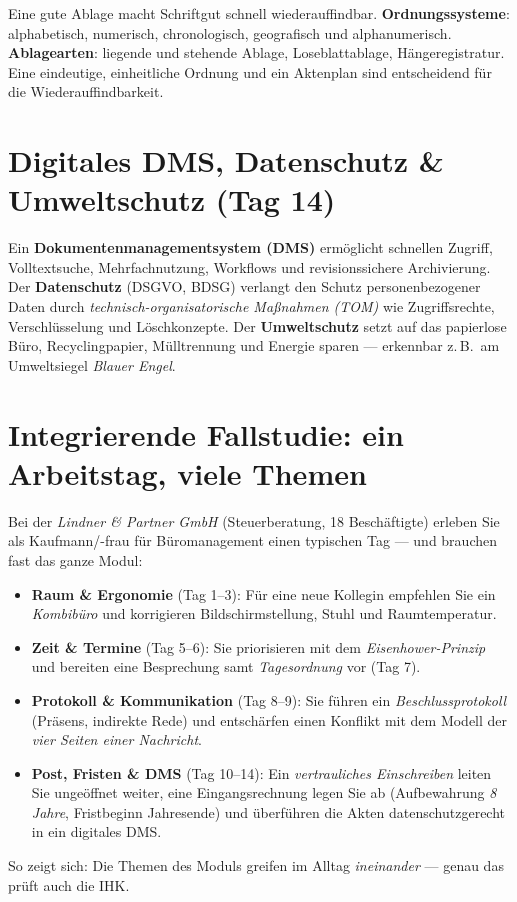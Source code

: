\documentclass[11pt, a4paper]{article}
\begin{document}
Eine gute Ablage macht Schriftgut schnell wiederauffindbar. \textbf{Ordnungssysteme}:
alphabetisch, numerisch, chronologisch, geografisch und alphanumerisch. \textbf{Ablagearten}:
liegende und stehende Ablage, Loseblattablage, Hängeregistratur. Eine eindeutige,
einheitliche Ordnung und ein Aktenplan sind entscheidend für die Wiederauffindbarkeit.

\section{Digitales DMS, Datenschutz \& Umweltschutz (Tag 14)}

Ein \textbf{Dokumentenmanagementsystem (DMS)} ermöglicht schnellen Zugriff, Volltextsuche,
Mehrfachnutzung, Workflows und revisionssichere Archivierung. Der \textbf{Datenschutz}
(DSGVO, BDSG) verlangt den Schutz personenbezogener Daten durch \emph{technisch-organisatorische
Maßnahmen (TOM)} wie Zugriffsrechte, Verschlüsselung und Löschkonzepte. Der
\textbf{Umweltschutz} setzt auf das papierlose Büro, Recyclingpapier, Mülltrennung und
Energie sparen --- erkennbar z.\,B.\ am Umweltsiegel \emph{Blauer Engel}.

\section{Integrierende Fallstudie: ein Arbeitstag, viele Themen}

\begin{beispiel}
Bei der \emph{Lindner \& Partner GmbH} (Steuerberatung, 18 Beschäftigte) erleben Sie als
Kaufmann/-frau für Büromanagement einen typischen Tag --- und brauchen fast das ganze
Modul:
\begin{itemize}
  \item \textbf{Raum \& Ergonomie} (Tag 1--3): Für eine neue Kollegin empfehlen Sie ein
    \emph{Kombibüro} und korrigieren Bildschirmstellung, Stuhl und Raumtemperatur.
  \item \textbf{Zeit \& Termine} (Tag 5--6): Sie priorisieren mit dem \emph{Eisenhower-Prinzip}
    und bereiten eine Besprechung samt \emph{Tagesordnung} vor (Tag 7).
  \item \textbf{Protokoll \& Kommunikation} (Tag 8--9): Sie führen ein \emph{Beschlussprotokoll}
    (Präsens, indirekte Rede) und entschärfen einen Konflikt mit dem Modell der
    \emph{vier Seiten einer Nachricht}.
  \item \textbf{Post, Fristen \& DMS} (Tag 10--14): Ein \emph{vertrauliches Einschreiben}
    leiten Sie ungeöffnet weiter, eine Eingangsrechnung legen Sie ab (Aufbewahrung
    \emph{8 Jahre}, Fristbeginn Jahresende) und überführen die Akten datenschutz\-gerecht
    in ein digitales DMS.
\end{itemize}
So zeigt sich: Die Themen des Moduls greifen im Alltag \emph{ineinander} --- genau das
prüft auch die IHK.
\end{beispiel}
\end{document}
